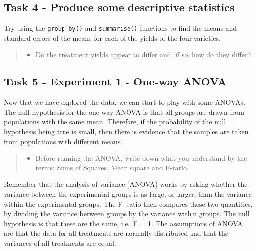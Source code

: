 \documentclass[
]{book}
\providecommand{\tightlist}{%
  \setlength{\itemsep}{0pt}\setlength{\parskip}{0pt}}
\begin{document}
\hypertarget{c5t4}{%
\subsection{Task 4 - Produce some descriptive statistics}\label{c5t4}}

Try using the \texttt{group\_by()} and \texttt{summarise()} functions to find the means and standard errors of the means for each of the yields of the four varieties.

\begin{quote}
\begin{itemize}
\tightlist
\item
  Do the treatment yields appear to differ and, if so, how do they differ?
\end{itemize}
\end{quote}

\hypertarget{task-5---experiment-1---one-way-anova}{%
\subsection{Task 5 - Experiment 1 - One-way ANOVA}\label{task-5---experiment-1---one-way-anova}}

Now that we have explored the data, we can start to play with some ANOVAs. The null hypothesis for the one-way ANOVA is that all groups are drawn from populations with the same mean. Therefore, if the probability of the null hypothesis being true is small, then there is evidence that the samples are taken from populations with different means.

\begin{quote}
\begin{itemize}
\tightlist
\item
  Before running the ANOVA, write down what you understand by the terms: Sums of Squares, Mean square and F-ratio.
\end{itemize}
\end{quote}

Remember that the analysis of variance (ANOVA) works by asking whether the variance between the experimental groups is as large, or larger, than the variance within the experimental groups. The F- ratio then compares these two quantities, by dividing the variance between groups by the variance within groups. The null hypothesis is that these are the same, i.e.~F = 1. The assumptions of ANOVA are that the data for all treatments are normally distributed and that the variances of all treatments are equal.
\end{document}
